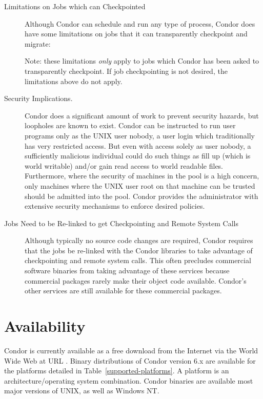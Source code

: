\begin{description}

	\item[Limitations on Jobs which can Checkpointed] Although Condor can schedule and
run any type of process, Condor does have some limitations on jobs that it can
transparently checkpoint and migrate:



	Note: these limitations \emph{only} apply to jobs which Condor
has been asked to transparently checkpoint.  If job checkpointing is not
desired, the limitations above do not apply.

	\item[Security Implications.] Condor does a significant amount of
	work to prevent security hazards, but loopholes are known to exist.
	Condor can be instructed to run user programs only as the UNIX
	user nobody, a user login which traditionally has very 
	restricted access.
	But even with access solely as user nobody,
	a sufficiently malicious individual could do such things as fill up
	 (which is world writable) and/or gain read access to
	world readable files.
	Furthermore, where the security of machines in the pool is a
	high concern, 
	only machines where the UNIX user root on that machine can be
	trusted should be admitted into the pool.
	Condor provides the administrator with extensive security mechanisms 
	to enforce desired policies.

	\item[Jobs Need to be Re-linked to get Checkpointing and Remote System Calls] Although 
typically no source code changes are required,
Condor requires
that the jobs be re-linked with the Condor libraries to take
advantage of checkpointing and remote system calls. This often
precludes commercial software binaries from taking advantage of these services
because commercial packages rarely make their object code
available. 
Condor's other services are still available for these commercial packages.

\end{description}

\section{\label{sec:Availability}Availability}
Condor is currently available as a free download from the Internet via the World Wide Web at  
URL .
Binary distributions of Condor version 6.x are available for the platforms 
detailed in Table~\ref{supported-platforms}.  A platform is an 
architecture/operating system combination.  
Condor binaries are available most major versions of UNIX, as well as
Windows NT.  

